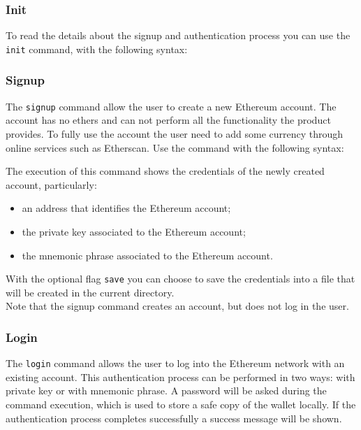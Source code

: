 \subsubsection{Init}
To read the details about the signup and authentication process you can use the \texttt{init} command, with the following syntax:
\begin{center}
\end{center}

\subsubsection{Signup}
The \texttt{signup} command allow the user to create a new Ethereum account. The account has no ethers and can not perform all the functionality the product provides.
To fully use the account the user need to add some currency through online services such as Etherscan.
Use the command with the following syntax:

\begin{center}
\end{center}

\noindent The execution of this command shows the credentials of the newly created account, particularly:
\begin{itemize}
	\item an address that identifies the Ethereum account;
	\item the private key associated to the Ethereum account;
	\item the mnemonic phrase associated to the Ethereum account.
\end{itemize}
With the optional flag \texttt{save} you can choose to save the credentials into a file that will be created in the current directory. \\
Note that the signup command creates an account, but does not log in the user.

\subsubsection{Login}
The \texttt{login} command allows the user to log into the Ethereum network with an existing account.
This authentication process can be performed in two ways: with private key or with mnemonic phrase.
A password will be asked during the command execution, which is used to store a safe copy of the wallet locally. If the authentication process completes successfully a success message will be shown.

